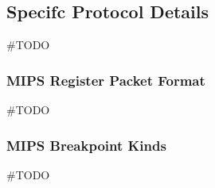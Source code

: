 \subsection{Specifc Protocol Details}

\#TODO

\subsubsection{MIPS Register Packet Format}
\#TODO

\subsubsection{MIPS Breakpoint Kinds}
\#TODO
